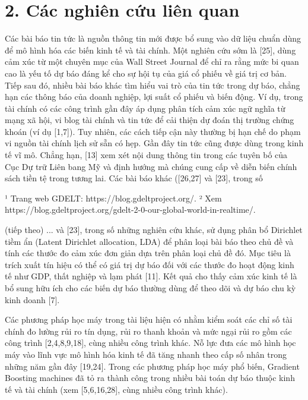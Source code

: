 \section{2. Các nghiên cứu liên quan}

Các bài báo tin tức là nguồn thông tin mới được bổ sung vào dữ liệu chuẩn dùng để mô hình hóa các biến kinh tế và tài chính. Một nghiên cứu sớm là {[}25{]}, dùng cảm xúc từ một chuyên mục của Wall Street Journal để chỉ ra rằng mức bi quan cao là yếu tố dự báo đáng kể cho sự hội tụ của giá cổ phiếu về giá trị cơ bản. Tiếp sau đó, nhiều bài báo khác tìm hiểu vai trò của tin tức trong dự báo, chẳng hạn các thông báo của doanh nghiệp, lợi suất cổ phiếu và biến động. Ví dụ, trong tài chính có các công trình gần đây áp dụng phân tích cảm xúc ngữ nghĩa từ mạng xã hội, vi blog tài chính và tin tức để cải thiện dự đoán thị trường chứng khoán (ví dụ {[}1,7{]}). Tuy nhiên, các cách tiếp cận này thường bị hạn chế do phạm vi nguồn tài chính lịch sử sẵn có hẹp. Gần đây tin tức cũng được dùng trong kinh tế vĩ mô. Chẳng hạn, {[}13{]} xem xét nội dung thông tin trong các tuyên bố của Cục Dự trữ Liên bang Mỹ và định hướng mà chúng cung cấp về diễn biến chính sách tiền tệ trong tương lai. Các bài báo khác ({[}26,27{]} và {[}23{]}, trong số

¹ Trang web GDELT: https://blog.gdeltproject.org/. ² Xem https://blog.gdeltproject.org/gdelt-2-0-our-global-world-in-realtime/.

(tiếp theo) ... và {[}23{]}, trong số những nghiên cứu khác, sử dụng phân bổ Dirichlet tiềm ẩn (Latent Dirichlet allocation, LDA) để phân loại bài báo theo chủ đề và tính các thước đo cảm xúc đơn giản dựa trên phân loại chủ đề đó. Mục tiêu là trích xuất tín hiệu có thể có giá trị dự báo đối với các thước đo hoạt động kinh tế như GDP, thất nghiệp và lạm phát {[}11{]}. Kết quả cho thấy cảm xúc kinh tế là bổ sung hữu ích cho các biến dự báo thường dùng để theo dõi và dự báo chu kỳ kinh doanh {[}7{]}.

Các phương pháp học máy trong tài liệu hiện có nhằm kiểm soát các chỉ số tài chính đo lường rủi ro tín dụng, rủi ro thanh khoản và mức ngại rủi ro gồm các công trình {[}2,4,8,9,18{]}, cùng nhiều công trình khác. Nỗ lực đưa các mô hình học máy vào lĩnh vực mô hình hóa kinh tế đã tăng nhanh theo cấp số nhân trong những năm gần đây {[}19,24{]}. Trong các phương pháp học máy phổ biến, Gradient Boosting machines đã tỏ ra thành công trong nhiều bài toán dự báo thuộc kinh tế và tài chính (xem {[}5,6,16,28{]}, cùng nhiều công trình khác).

